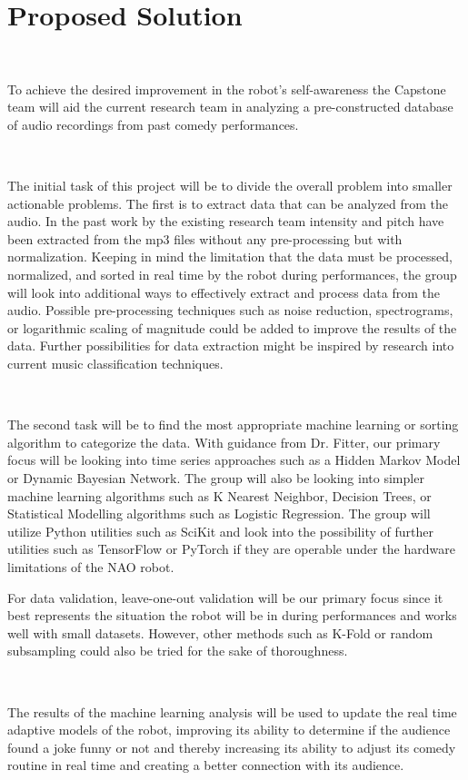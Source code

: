 \documentclass[onecolumn, draftclsnofoot,10pt, compsoc]{IEEEtran}
\begin{document}
\section{Proposed Solution}
\ \par
\noindent To achieve the desired improvement in the robot's self-awareness the Capstone team will aid the current research team in analyzing a pre-constructed database of audio recordings from past comedy performances.\par
\ \par
\noindent The initial task of this project will be to divide the overall problem into smaller actionable problems. The first is to extract data that can be analyzed from the audio. In the past work by the existing research team intensity and pitch have been extracted from the mp3 files without any pre-processing but with normalization. Keeping in mind the limitation that the data must be processed, normalized, and sorted in real time by the robot during performances, the group will look into additional ways to effectively extract and process data from the audio. Possible pre-processing techniques such as noise reduction, spectrograms, or logarithmic scaling of magnitude could be added to improve the results of the data. Further possibilities for data extraction might be inspired by research into current music classification techniques.\par
\ \par
\noindent The second task will be to find the most appropriate machine learning or sorting algorithm to categorize the data. With guidance from Dr. Fitter, our primary focus will be looking into time series approaches such as a Hidden Markov Model or Dynamic Bayesian Network. The group will also be looking into simpler machine learning algorithms such as K Nearest Neighbor, Decision Trees, or Statistical Modelling algorithms such as Logistic Regression. The group will utilize Python utilities such as SciKit and look into the possibility of further utilities such as TensorFlow or PyTorch if they are operable under the hardware limitations of the NAO robot.\par
\noindent For data validation, leave-one-out validation will be our primary focus since it best represents the situation the robot will be in during performances and works well with small datasets. However, other methods such as K-Fold or random subsampling could also be tried for the sake of thoroughness.\par
\ \par
\noindent The results of the machine learning analysis will be used to update the real time adaptive models of the robot, improving its ability to determine if the audience found a joke funny or not and thereby increasing its ability to adjust its comedy routine in real time and creating a better connection with its audience.
\end{document}
